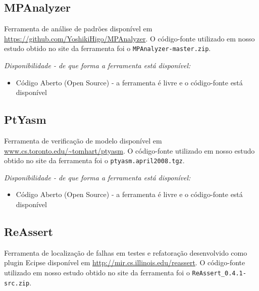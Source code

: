 \subsection{MPAnalyzer}

Ferramenta de análise de padrões disponível em
\url{https://github.com/YoshikiHigo/MPAnalyzer}. O código-fonte utilizado em
nosso estudo obtido no site da ferramenta foi o \texttt{MPAnalyzer-master.zip}.

\begin{description}

  \item {\it Disponibilidade - de que forma a ferramenta está disponível:}
    \begin{itemize}
      \item Código Aberto (Open Source) - a ferramenta é livre e o código-fonte está disponível
    \end{itemize}

\end{description}

\subsection{PtYasm}

Ferramenta de verificação de modelo disponível em
\url{www.cs.toronto.edu/~tomhart/ptyasm}. O código-fonte
utilizado em nosso estudo obtido no site da ferramenta foi o
\texttt{ptyasm.april2008.tgz}.

\begin{description}

  \item {\it Disponibilidade - de que forma a ferramenta está disponível:}
    \begin{itemize}
      \item Código Aberto (Open Source) - a ferramenta é livre e o código-fonte está disponível
    \end{itemize}

\end{description}

\subsection{ReAssert}

Ferramenta de localização de falhas em testes e refatoração
desenvolvido como plugin Ecipse disponível em
\url{http://mir.cs.illinois.edu/reassert}. O código-fonte utilizado em nosso
estudo obtido no site da ferramenta foi o \texttt{ReAssert\_0.4.1-src.zip}.

